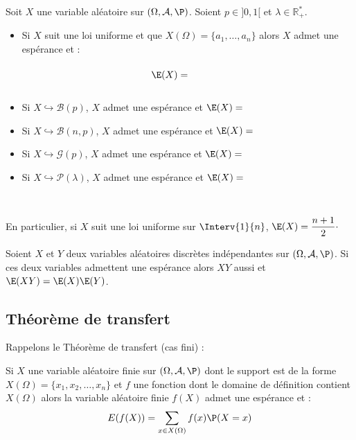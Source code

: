 \documentclass[a4paper,10pt]{report}
\begin{document}
\begin{thm}
Soit $X$ une variable aléatoire sur $(\Omega, \mathcal{A}, \P)$. Soient $p \in ]0,1[$ et $\lambda \in \mathbb{R}_+^{*}$.

\begin{itemize}
\item Si $X$ suit une loi uniforme et que $X(\Omega)= \lbrace a_1, \ldots, a_n \rbrace$ alors $X$ admet une espérance et :
$$ \E(X) = \phantom{\dfrac{1}{n} \sum_{i = 1}^n a_i}$$
\item Si $X \hookrightarrow \mathcal{B}(p)$, $X$ admet une espérance et $\E(X)=$
\item Si $X \hookrightarrow \mathcal{B}(n,p)$, $X$ admet une espérance et $\E(X)=$
\item Si $X \hookrightarrow \mathcal{G}(p)$, $X$ admet une espérance et $\E(X)= $
\item Si $X \hookrightarrow \mathcal{P}(\lambda)$, $X$ admet une espérance et $\E(X)=$
\end{itemize}
\end{thm}

\newpage

$\phantom{}$
\begin{preuve}
\vspace{12cm}
\end{preuve}

\begin{rem} En particulier, si $X$ suit une loi uniforme sur $\Interv{1}{n}$, $\E(X) = \dfrac{n+1}{2} \cdot$
\end{rem}

\begin{prop}[Admise] Soient $X$ et $Y$ deux variables aléatoires discrètes indépendantes sur $(\Omega, \mathcal{A}, \P)$. Si ces deux variables admettent une espérance alors $XY$ aussi et $\E(XY)=\E(X)\E(Y)$.
\end{prop}
\subsection{Théorème de transfert}

\noindent Rappelons le Théorème de transfert (cas fini) : 


\begin{thm}
Si $X$ une variable aléatoire finie sur $(\Omega, \mathcal{A}, \P)$ dont le support est de la forme $X(\Omega) = \{x_1, x_2, \ldots, x_n\}$ et $f$ une fonction dont le domaine de définition contient $X(\Omega)$ alors la variable aléatoire finie $f(X)$ admet une espérance et :
 $$ E(f(X)) = \sum_{x \in X(\Omega)} f(x) \P(X=x)$$
 \end{thm}
\end{document}
